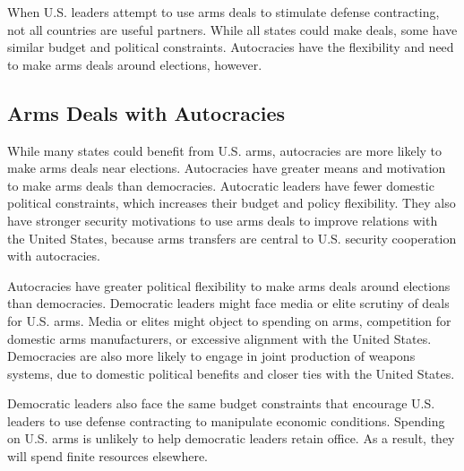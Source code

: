 \documentclass[12pt]{article}
\begin{document}
When U.S. leaders attempt to use arms deals to stimulate defense contracting, not all countries are useful partners. 
While all states could make deals, some have similar budget and political constraints. 
Autocracies have the flexibility and need to make arms deals around elections, however.



\subsection{Arms Deals with Autocracies}


While many states could benefit from U.S. arms, autocracies are more likely to make arms deals near elections. 
Autocracies have greater means and motivation to make arms deals than democracies.
Autocratic leaders have fewer domestic political constraints, which increases their budget and policy flexibility. 
They also have stronger security motivations to use arms deals to improve relations with the United States, because arms transfers are central to U.S. security cooperation with autocracies.




Autocracies have greater political flexibility to make arms deals around elections than democracies. 
Democratic leaders might face media or elite scrutiny of deals for U.S. arms.
Media or elites might object to spending on arms, competition for domestic arms manufacturers, or excessive alignment with the United States.
Democracies are also more likely to engage in joint production of weapons systems, due to domestic political benefits and closer ties with the United States.


Democratic leaders also face the same budget constraints that encourage U.S. leaders to use defense contracting to manipulate economic conditions. 
Spending on U.S. arms is unlikely to help democratic leaders retain office. 
As a result, they will spend finite resources elsewhere. 
\end{document}
